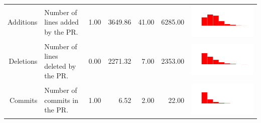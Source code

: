 \begin{table}[ht]
\begin{tabular}{rp{26em}rrrrc}
    Additions & Number of lines added by the PR. & 1.00 & 3649.86 & 41.00 & 6285.00 & \includegraphics[scale = 0.1, clip = true, trim= 50px 60px 50px 60px]{../figs/hist-features/hist-additions.pdf} \\
    Deletions & Number of lines deleted by the PR. & 0.00 & 2271.32 & 7.00 & 2353.00 & \includegraphics[scale = 0.1, clip = true, trim= 50px 60px 50px 60px]{../figs/hist-features/hist-deletions.pdf} \\
    Commits & Number of commits in the PR. & 1.00 & 6.52 & 2.00 & 22.00 & \includegraphics[scale = 0.1, clip = true, trim= 50px 60px 50px 60px]{../figs/hist-features/hist-commits.pdf} \\

\end{tabular}
\end{table}
